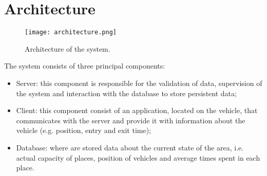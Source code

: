 \chapter{Architecture}\label{Chap:Architecture}
\begin{figure}[!htb]
   \centering
   \texttt{[image: architecture.png]}
   \caption{Architecture of the system.}\label{Fig:ArchNoImpl}
\end{figure}
The system consists of three principal components:
\begin{itemize}
  \item Server: this component is responsible for the validation of data, supervision of the system and interaction with the database
    to store persistent data;
  \item Client: this component consist of an application, located on the vehicle, that communicates with the server and provide it with information about the vehicle (e.g. position, entry and exit time);
  \item Database: where are stored data about the current state of the area, i.e. actual capacity of places, position of vehicles and
  average times spent in each place.
\end{itemize}

